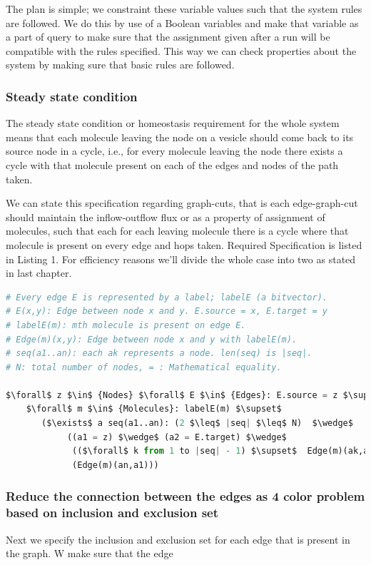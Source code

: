 \documentclass[preprint,12pt]{elsarticle}
\begin{document}
The plan is simple; we constraint these variable values such that the system rules are followed. We do this by use of a Boolean variables and make that variable as a part of query to make sure that the assignment given after a run will be compatible with the rules specified. This way we can check properties about the system by making sure that basic rules are followed.  

\subsubsection{Steady state condition}
The steady state condition or homeostasis requirement for the whole system means that each molecule leaving the node on a vesicle should come back to its source node in a cycle, i.e., for every molecule leaving the node there exists a cycle with that molecule present on each of the edges and nodes of the path taken. 

We can state this specification regarding graph-cuts, that is each edge-graph-cut should maintain the inflow-outflow flux or as a property of assignment of molecules, such that each for each leaving molecule there is a cycle where that molecule is present on every edge and hops taken. Required Specification is listed in Listing 1. For efficiency reasons we'll divide the whole case into two as stated in last chapter.

\begin{lstlisting}[language=Python,
mathescape,
 breaklines,
  rulecolor=\color{black},
  frame=single,
  caption= \textbf{Steady state specification.}
]
# Every edge E is represented by a label; labelE (a bitvector).
# E(x,y): Edge between node x and y. E.source = x, E.target = y    
# labelE(m): mth molecule is present on edge E.
# Edge(m)(x,y): Edge between node x and y with labelE(m).                 
# seq(a1..an): each ak represents a node. len(seq) is |seq|.
# N: total number of nodes, = : Mathematical equality.
 
$\forall$ z $\in$ {Nodes} $\forall$ E $\in$ {Edges}: E.source = z $\supset$
    $\forall$ m $\in$ {Molecules}: labelE(m) $\supset$
       ($\exists$ a seq(a1..an): (2 $\leq$ |seq| $\leq$ N)  $\wedge$
            ((a1 = z) $\wedge$ (a2 = E.target) $\wedge$
             (($\forall$ k from 1 to |seq| - 1) $\supset$  Edge(m)(ak,ak+1)) $\wedge$
             (Edge(m)(an,a1)))

\end{lstlisting}

\subsubsection{Reduce the connection between the edges as 4 color problem based on inclusion and exclusion set}
Next we specify the inclusion and exclusion set for each edge that is present in the graph. W make sure that the edge  
\end{document}
